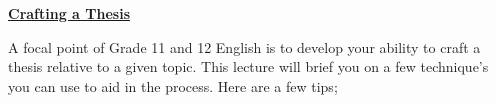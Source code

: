 \documentclass[12pt]{article} %
\begin{document}
	\renewcommand*{\coursecode}{MATH 235} %
	\renewcommand*{\assgnnumber}{Assignment 1} %
	\renewcommand*{\submdate}{September 14, 2021} %
	\renewcommand*{\studentfname}{Abdullah} %
	\renewcommand*{\studentlname}{Zubair} %
    \renewcommand*{\proofname}{Proof:}

	\renewcommand\qedsymbol{$\blacksquare$}
	\setfigpath
	\fancyhfoffset[L,O]{0pt} %




\begin{center}
	\textbf{\underline{\Huge{Crafting a Thesis}}}
\end{center}

A focal point of Grade 11 and 12 English is to develop your ability to craft a thesis relative to a given topic. This lecture will brief you on a few technique's
you can use to aid in the process. Here are a few tips;
\end{document}
